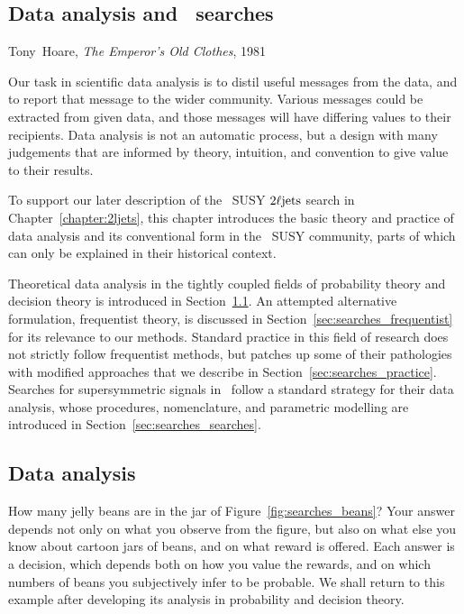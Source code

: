 \begin{singlespacing}
\chapter{Data analysis and \atlas\ searches}
\label{chapter:searches}
\begin{epigraphs}
%
{Tony~Hoare,
\textit{The Emperor’s Old Clothes},
1981~\cite{hoare2007emperor}}
\end{epigraphs}
\end{singlespacing}

\noindent Our task in scientific data analysis is to distil useful messages from the
data, and to report that message to the wider community.
Various messages could be extracted from given data,
and those messages will have differing values to their recipients.
Data analysis is not an automatic process, but a design with many judgements
that are informed by theory, intuition, and convention to give value to their
results.

To support our later description of the \atlas\ SUSY $2\ell\mathrm{jets}$ search in
Chapter~\ref{chapter:2ljets}, this chapter introduces the basic theory and
practice of data analysis and its conventional form in the \atlas\ SUSY
community, parts of which can only be explained in their historical context.

Theoretical data analysis in the tightly coupled fields of probability theory
and decision theory is introduced in Section~\ref{sec:searches_data_analysis}.
An attempted alternative formulation, frequentist theory, is discussed in
Section~\ref{sec:searches_frequentist} for its relevance to our methods.
Standard practice in this field of research does not strictly follow
frequentist methods, but patches up some of their pathologies with modified
approaches that we describe in Section~\ref{sec:searches_practice}.
Searches for supersymmetric signals in \atlas\ follow a standard strategy for
their data analysis, whose procedures, nomenclature, and parametric modelling
are introduced in Section~\ref{sec:searches_searches}.


\section{Data analysis}
\label{sec:searches_data_analysis}
How many jelly beans are in the jar of Figure~\ref{fig:searches_beans}?
Your answer depends not only on what you observe from the figure, but also on
what else you know about cartoon jars of beans, and on what reward is offered.
Each answer is a decision, which depends both on how you value the rewards,
and on which numbers of beans you subjectively infer to be probable.
We shall return to this example after developing its analysis in probability
and decision theory.

